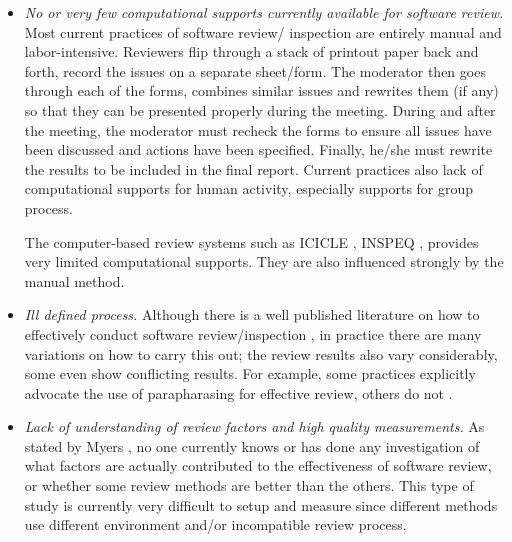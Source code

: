 \begin {itemize}
\item {\sl No or very  few computational supports currently available for
software review.}
Most current practices of software review/ inspection are entirely
manual and labor-intensive. Reviewers flip through a stack of printout
paper back and forth, record the issues on a separate sheet/form. The
moderator then goes through each of the forms, combines similar
issues and rewrites them (if any) so that they can be presented
properly during the meeting. During and after the meeting, the
moderator must recheck the forms to ensure
all issues have been discussed and actions have been specified.
Finally, he/she must rewrite the results to be included in the final
report.
Current practices also lack of computational supports for human
activity, especially supports for group process. 

The computer-based review systems such as
ICICLE \cite{Brothers90}, INSPEQ \cite{Knight91}, provides very limited
computational supports. They are also influenced strongly by the
manual method. 

\item {\sl Ill defined process.}
    Although there is a well published literature on how to
    effectively conduct software review/inspection \cite{Fagan76}, in
    practice there
    are many variations on how to carry this out; the
    review results also vary considerably, some even show conflicting
    results.  For example, some practices
    \cite{Fagan76,Russel91} explicitly 
    advocate the use of parapharasing for effective review, others
    do not \cite{Humphrey90}.

\item {\sl Lack of understanding of review factors and high quality
measurements.}
As stated by Myers \cite{Myers79}, no one currently knows or has done any
investigation of what factors are actually contributed to the
effectiveness of software review, or whether some review methods are
better than the others. This type of study is currently very
difficult to setup and measure  since different methods use different
environment and/or incompatible review process. 


\end{itemize}
